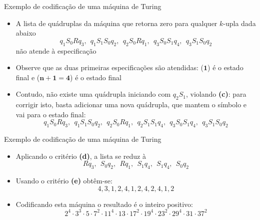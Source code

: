\begin{frame}[fragile]{Exemplo de codificação de uma máquina de Turing}

    \begin{itemize}
        \item A lista de quádruplas da máquina que retorna zero para qualquer $k$-upla dada abaixo
        \[
            q_1S_0Rq_3, \ \ q_1S_1S_0q_2, \ \ q_2S_0Rq_1, \ \ q_3S_0S_1q_4, \ \ q_3S_1S_0q_2
        \]
        não atende à especificação

        \item Observe que as duas primeiras especificações são atendidas: ($\mathbf{1}$) é o 
            estado final e ($\mathbf{n + 1} = \mathbf{4}$) é o estado final

        \item Contudo, não existe uma quádrupla iniciando com $q_2S_1$, violando \textbf{(c)}:
            para corrigir isto, basta adicionar uma nova quádrupla, que mantem o símbolo e 
            vai para o estado final:
        \[
            q_1S_0Rq_3, \ \ q_1S_1S_0q_2, \ \ q_2S_0Rq_1,\ \ q_2S_1S_1q_4,\ \ q_3S_0S_1q_4, \ \ q_3S_1S_0q_2
        \]
        
    \end{itemize}

\end{frame}

\begin{frame}[fragile]{Exemplo de codificação de uma máquina de Turing}

    \begin{itemize}
        \item Aplicando o critério \textbf{(d)}, a lista se reduz à
        \[
            Rq_3, \ \ S_0q_2, \ \ Rq_1,\ \ S_1q_4,\ \ S_1q_4, \ \ S_0q_2
        \]

        \item Usando o critério \textbf{(e)} obtêm-se:
        \[
            4, 3, 1, 2, 4, 1, 2, 4, 2, 4, 1, 2
        \]

        \item Codificando esta máquina o resultado é o inteiro positivo:
        \[
            2^4\cdot 3^3\cdot 5\cdot 7^2\cdot 11^4\cdot 13\cdot 17^2\cdot 19^4\cdot 23^2\cdot 29^4\cdot 31\cdot 37^2
        \]
    \end{itemize}

\end{frame}

